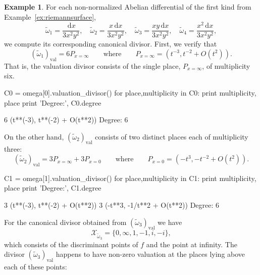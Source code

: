 \documentclass[12pt]{article}
\theoremstyle{definition}
\newtheorem{example}[theorem]{Example}
\newcommand{\dx}{\,\mathrm{d}x}
\begin{document}
\begin{example} \label{ex:canonical} %
For each non-normalized Abelian differential of the first kind from
Example~\ref{ex:riemannsurface},
\begin{equation}
  \tilde{\omega}_1 = \frac{\dx}{3x^2y^2}, \quad
  \tilde{\omega}_2 = \frac{x\dx}{3x^2y^2}, \quad
  \tilde{\omega}_3 = \frac{xy\dx}{3x^2y^2}, \quad
  \tilde{\omega}_4 = \frac{x^2\dx}{3x^2y^2},
\end{equation}
we compute its corresponding canonical divisor. First, we verify that
\begin{equation}
  (\tilde{\omega}_1)_\text{val} = 6 P_{x=\infty}
  \qquad
  \text{where}
  \qquad
  P_{x=\infty} = \left( t^{-3}, t^{-2} + O\left( t^2 \right) \right).
\end{equation}
That is, the valuation divisor consists of the single place,
$P_{x=\infty}$, of multiplicity six.
\begin{ipythoninput}
C0 = omega[0].valuation_divisor()
for place,multiplicity in C0:
    print multiplicity, place
print 'Degree:', C0.degree
\end{ipythoninput}
\begin{ipythonoutput}
6 (t**(-3), t**(-2) + O(t**2))
Degree: 6
\end{ipythonoutput}
On the other hand, $(\tilde{\omega}_2)_\text{val}$ consists of two
distinct places each of multiplicity three:
\begin{equation}
  (\tilde{\omega}_2)_\text{val} = 3 P_{x=\infty} + 3 P_{x=0}
  \qquad
  \text{where}
  \qquad
  P_{x=0} = \left( -t^3, -t^{-2} + O(t^2) \right).
\end{equation}
\begin{ipythoninput}
C1 = omega[1].valuation_divisor()
for place,multiplicity in C1:
    print multiplicity, place
print 'Degree:', C1.degree
\end{ipythoninput}
\begin{ipythonoutput}
3 (t**(-3), t**(-2) + O(t**2))
3 (-t**3, -1/t**2 + O(t**2))
Degree: 6
\end{ipythonoutput}
For the canonical divisor obtained from $(\tilde{\omega}_3)_\text{val}$
we have
\begin{equation}
  \mathcal{X}_{\tilde{\omega}_3} = \{0,\infty,1,-1,i,-i\},
\end{equation}
which consists of the discriminant points of $f$ and the point at
infinity. The divisor $(\tilde{\omega}_3)_\text{val}$ happens to have
non-zero valuation at the places lying above each of these points:

\end{example}
\end{document}

